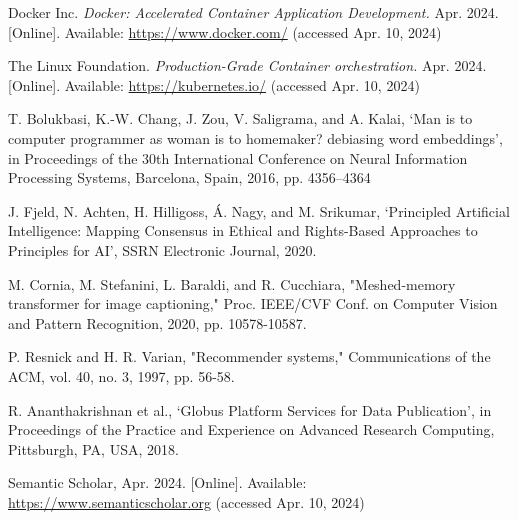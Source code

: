 \documentclass[a4paper,conference]{IEEEtran}
\begin{document}
\begin{thebibliography}{99}
Docker Inc. \emph{Docker: Accelerated Container Application Development.} Apr. 2024. [Online]. Available: \url{https://www.docker.com/} (accessed Apr. 10, 2024)

The Linux Foundation. \emph{Production-Grade Container orchestration.} Apr. 2024. [Online]. Available: \url{https://kubernetes.io/} (accessed Apr. 10, 2024)

T. Bolukbasi, K.-W. Chang, J. Zou, V. Saligrama, and A. Kalai, ‘Man is to computer programmer as woman is to homemaker? debiasing word embeddings’, in Proceedings of the 30th International Conference on Neural Information Processing Systems, Barcelona, Spain, 2016, pp. 4356–4364

J. Fjeld, N. Achten, H. Hilligoss, Á. Nagy, and M. Srikumar, ‘Principled Artificial Intelligence: Mapping Consensus in Ethical and Rights-Based Approaches to Principles for AI’, SSRN Electronic Journal, 2020.


M. Cornia, M. Stefanini, L. Baraldi, and R. Cucchiara, "Meshed-memory transformer for image captioning," Proc. IEEE/CVF Conf. on Computer Vision and Pattern Recognition, 2020, pp. 10578-10587.

P. Resnick and H. R. Varian, "Recommender systems," Communications of the ACM, vol. 40, no. 3, 1997, pp. 56-58.

R. Ananthakrishnan et al., ‘Globus Platform Services for Data Publication’, in Proceedings of the Practice and Experience on Advanced Research Computing, Pittsburgh, PA, USA, 2018.

Semantic Scholar, Apr. 2024. [Online]. Available: \url{https://www.semanticscholar.org} (accessed Apr. 10, 2024)
\end{thebibliography}
\end{document}
